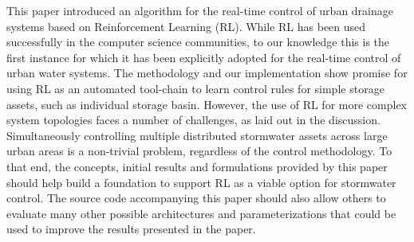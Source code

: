 This paper introduced an algorithm for the real-time control of urban drain\-age systems based on Reinforcement Learning (RL).
While RL has been used successfully in the computer science communities, to our knowledge this is the first instance for which it has been explicitly adopted for the real-time control of urban water systems.
The methodology and our implementation show promise for using RL as an automated tool-chain to learn control rules for simple storage assets, such as individual storage basin.
However, the use of RL for more complex system topologies faces a number of challenges, as laid out in the discussion.
Simultaneously controlling multiple distributed stormwater assets across large urban areas is a non-trivial problem, regardless of the control methodology.
To that end, the concepts, initial results and formulations provided by this paper should help build a foundation to support RL as a viable option for stormwater control.
The source code accompanying this paper should also allow others to evaluate many other possible architectures and parameterizations that could be used to improve the results presented in the paper.



